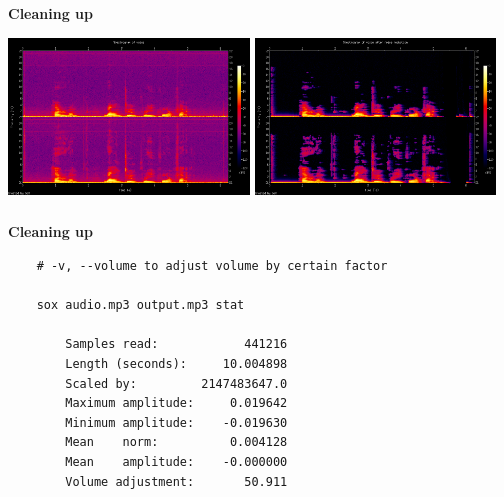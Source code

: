 \documentclass[usenames,dvipsnames, 18pt, compress, aspectratio=169]{beamer}
\begin{document}
\begin{frame}[fragile]{}
    \frametitle{}
    \begin{center}
        \textbf{Cleaning up}
        \vspace{0.2cm}

        \includegraphics[width=0.48\textwidth]{voice-spectrogram.png}
        \hfill
        \includegraphics[width=0.48\textwidth]{voice-clean-spectrogram.png}

    \end{center}
\end{frame}

\begin{frame}[fragile]{}
    \frametitle{}
    \begin{center}
        \textbf{Cleaning up}
        \vspace{0.2cm}

        \begin{verbatim}
    # -v, --volume to adjust volume by certain factor

    sox audio.mp3 output.mp3 stat

        Samples read:            441216
        Length (seconds):     10.004898
        Scaled by:         2147483647.0
        Maximum amplitude:     0.019642
        Minimum amplitude:    -0.019630
        Mean    norm:          0.004128
        Mean    amplitude:    -0.000000
        Volume adjustment:       50.911
        \end{verbatim}

    \end{center}
\end{frame}
\end{document}
